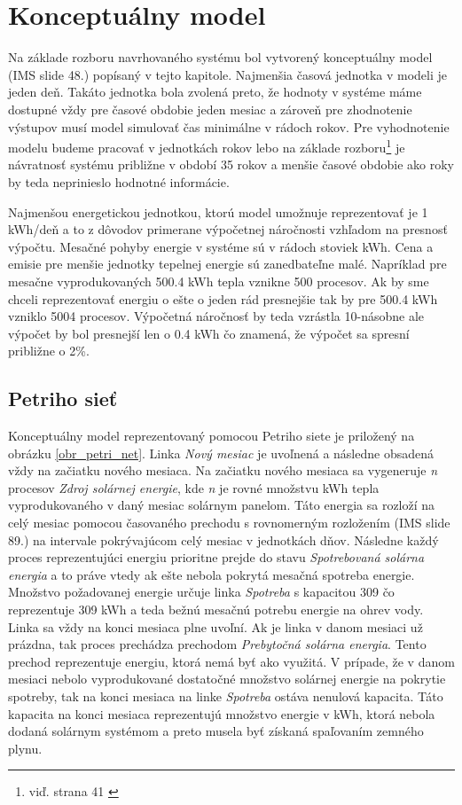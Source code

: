 \documentclass[a4paper, 11pt]{article}
\begin{document}
\section{Konceptuálny model}
Na základe rozboru navrhovaného systému bol vytvorený konceptuálny model (IMS\cite{ims_slides} slide 48.) popísaný v tejto kapitole.  Najmenšia časová jednotka v modeli je jeden deň. Takáto jednotka bola zvolená preto, že hodnoty v systéme máme dostupné vždy pre časové obdobie jeden mesiac a zároveň pre zhodnotenie výstupov musí model simulovať čas minimálne v rádoch rokov. Pre vyhodnotenie modelu budeme pracovať v jednotkách rokov lebo na základe rozboru\footnote{viď. strana 41 \cite{bc_solar_system}} je návratnosť systému približne v období 35 rokov a menšie časové obdobie ako roky by teda neprinieslo hodnotné informácie. 

Najmenšou energetickou jednotkou, ktorú model umožnuje reprezentovať je 1 kWh/deň a to z dôvodov primerane výpočetnej náročnosti vzhľadom na presnosť výpočtu. Mesačné pohyby energie v systéme sú v rádoch stoviek kWh. Cena a emisie pre menšie jednotky tepelnej energie sú zanedbateľne malé. Napríklad pre mesačne vyprodukovaných 500.4 kWh tepla vznikne 500 procesov. Ak by sme chceli reprezentovať energiu o ešte o jeden rád presnejšie tak by pre 500.4 kWh vzniklo 5004 procesov. Výpočetná náročnosť by teda vzrástla 10-násobne ale výpočet by bol presnejší len o 0.4 kWh čo znamená, že výpočet sa spresní približne o 2\%.


\subsection{Petriho sieť} \label{petri_net_section}
Konceptuálny model reprezentovaný pomocou Petriho siete je priložený na obrázku \ref{obr_petri_net}. Linka \textit{Nový mesiac} je uvoľnená a následne obsadená vždy na začiatku nového mesiaca. Na začiatku nového mesiaca sa vygeneruje \textit{n} procesov \textit{Zdroj solárnej energie}, kde \textit{n} je rovné množstvu kWh tepla vyprodukovaného v daný mesiac solárnym panelom. Táto energia sa rozloží na celý mesiac pomocou časovaného prechodu s rovnomerným rozložením (IMS\cite{ims_slides} slide 89.) na intervale pokrývajúcom celý mesiac v jednotkách dňov. Následne každý proces reprezentujúci energiu prioritne prejde do stavu \textit{Spotrebovaná solárna energia} a to práve vtedy ak ešte nebola pokrytá mesačná spotreba energie. Množstvo požadovanej energie určuje linka \textit{Spotreba} s kapacitou 309 čo reprezentuje 309 kWh a teda bežnú mesačnú potrebu energie na ohrev vody. Linka sa vždy na konci mesiaca plne uvoľní. Ak je linka v danom mesiaci už prázdna, tak proces prechádza prechodom \textit{Prebytočná solárna energia}. Tento prechod reprezentuje energiu, ktorá nemá byť ako využitá. V prípade, že v danom mesiaci nebolo vyprodukované dostatočné množstvo solárnej energie na pokrytie spotreby, tak na konci mesiaca na linke \textit{Spotreba} ostáva nenulová kapacita. Táto kapacita na konci mesiaca reprezentujú množstvo energie v kWh, ktorá nebola dodaná solárnym systémom a preto musela byť získaná spaľovaním zemného plynu.
\end{document}
